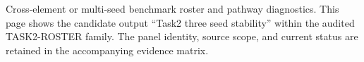 Cross-element or multi-seed benchmark roster and pathway diagnostics. This page shows the candidate output ``Task2 three seed stability'' within the audited TASK2-ROSTER family. The panel identity, source scope, and current status are retained in the accompanying evidence matrix.
